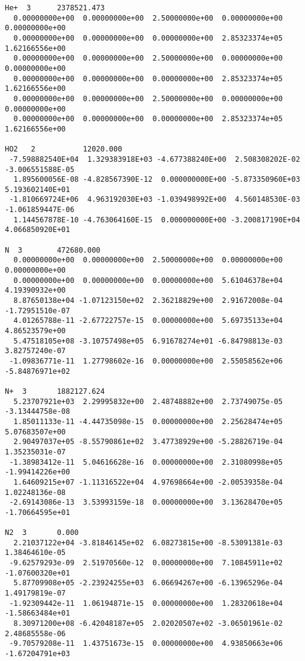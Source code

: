 \begin{verbatim}
He+  3		2378521.473						         
  0.00000000e+00  0.00000000e+00  2.50000000e+00  0.00000000e+00  0.00000000e+00
  0.00000000e+00  0.00000000e+00  0.00000000e+00  2.85323374e+05  1.62166556e+00
  0.00000000e+00  0.00000000e+00  2.50000000e+00  0.00000000e+00  0.00000000e+00
  0.00000000e+00  0.00000000e+00  0.00000000e+00  2.85323374e+05  1.62166556e+00
  0.00000000e+00  0.00000000e+00  2.50000000e+00  0.00000000e+00  0.00000000e+00
  0.00000000e+00  0.00000000e+00  0.00000000e+00  2.85323374e+05  1.62166556e+00
										 
HO2   2           12020.000                                                        
 -7.598882540E+04  1.329383918E+03 -4.677388240E+00  2.508308202E-02 -3.006551588E-05 
  1.895600056E-08 -4.828567390E-12  0.000000000E+00 -5.873350960E+03  5.193602140E+01 
 -1.810669724E+06  4.963192030E+03 -1.039498992E+00  4.560148530E-03 -1.061859447E-06 
  1.144567878E-10 -4.763064160E-15  0.000000000E+00 -3.200817190E+04  4.066850920E+01 
										 
N  3		472680.000							 
  0.00000000e+00  0.00000000e+00  2.50000000e+00  0.00000000e+00  0.00000000e+00
  0.00000000e+00  0.00000000e+00  0.00000000e+00  5.61046378e+04  4.19390932e+00
  8.87650138e+04 -1.07123150e+02  2.36218829e+00  2.91672008e-04 -1.72951510e-07
  4.01265788e-11 -2.67722757e-15  0.00000000e+00  5.69735133e+04  4.86523579e+00
  5.47518105e+08 -3.10757498e+05  6.91678274e+01 -6.84798813e-03  3.82757240e-07
 -1.09836771e-11  1.27798602e-16  0.00000000e+00  2.55058562e+06 -5.84876971e+02
										 
N+  3		1882127.624							 
  5.23707921e+03  2.29995832e+00  2.48748882e+00  2.73749075e-05 -3.13444758e-08
  1.85011133e-11 -4.44735098e-15  0.00000000e+00  2.25628474e+05  5.07683507e+00
  2.90497037e+05 -8.55790861e+02  3.47738929e+00 -5.28826719e-04  1.35235031e-07
 -1.38983412e-11  5.04616628e-16  0.00000000e+00  2.31080998e+05 -1.99414226e+00
  1.64609215e+07 -1.11316522e+04  4.97698664e+00 -2.00539358e-04  1.02248136e-08
 -2.69143086e-13  3.53993159e-18  0.00000000e+00  3.13628470e+05 -1.70664595e+01
										 
N2  3		0.000								 
  2.21037122e+04 -3.81846145e+02  6.08273815e+00 -8.53091381e-03  1.38464610e-05
 -9.62579293e-09  2.51970560e-12  0.00000000e+00  7.10845911e+02 -1.07600320e+01
  5.87709908e+05 -2.23924255e+03  6.06694267e+00 -6.13965296e-04  1.49179819e-07
 -1.92309442e-11  1.06194871e-15  0.00000000e+00  1.28320618e+04 -1.58663484e+01
  8.30971200e+08 -6.42048187e+05  2.02020507e+02 -3.06501961e-02  2.48685558e-06
 -9.70579208e-11  1.43751673e-15  0.00000000e+00  4.93850663e+06 -1.67204791e+03
										 

\end{verbatim}
